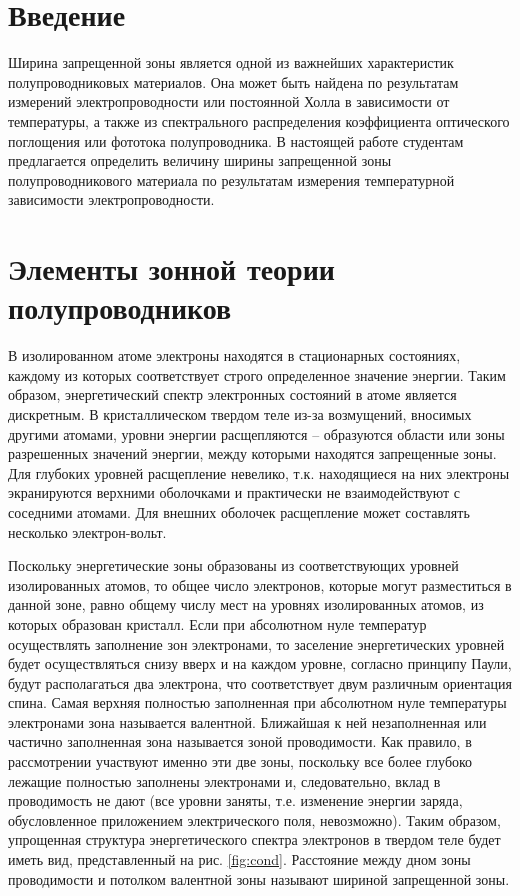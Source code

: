 

\renewcommand{\phi}{\varphi}



\def\labauthors{Виноградов И.Д., Шиков А.П.}
\def\labgroup{430}
\def\labnumber{1}
\def\labtheme{Измерение ширины запрещенной зоны}



\newpage
\section*{Введение}
Ширина запрещенной зоны является одной из важнейших характеристик полупроводниковых материалов. Она может быть найдена
по результатам измерений электропроводности или постоянной Холла в зависимости от температуры, а также из спектрального 
распределения коэффициента оптического поглощения или фототока полупроводника. В настоящей работе студентам предлагается
определить величину ширины запрещенной зоны полупроводникового материала по результатам измерения температурной зависимости 
электропроводности. 

\section{Элементы зонной теории полупроводников}
В изолированном атоме электроны находятся в стационарных состояниях, каждому из которых соответствует строго
определенное значение энергии. Таким образом, энергетический спектр электронных состояний в атоме является дискретным. В
кристаллическом твердом теле из-за возмущений, вносимых другими атомами, уровни энергии расщепляются – образуются
области или зоны разрешенных значений энергии, между которыми находятся запрещенные зоны. Для глубоких уровней
расщепление невелико, т.к. находящиеся на них электроны экранируются верхними оболочками и практически не
взаимодействуют с соседними атомами. Для внешних оболочек расщепление может составлять несколько электрон-вольт. 

Поскольку энергетические зоны образованы из соответствующих уровней изолированных атомов, то общее число электронов,
которые могут разместиться в данной зоне, равно общему числу мест на уровнях изолированных атомов, из которых образован
кристалл. Если при абсолютном нуле температур осуществлять заполнение зон электронами, то заселение энергетических
уровней будет осуществляться снизу вверх и на каждом уровне, согласно принципу Паули, будут располагаться два электрона,
что соответствует двум различным ориентация спина. Самая верхняя полностью заполненная при абсолютном нуле температуры
электронами зона называется валентной. Ближайшая к ней незаполненная или частично заполненная зона называется зоной
проводимости. Как правило, в рассмотрении участвуют именно эти две зоны, поскольку все более глубоко лежащие полностью
заполнены электронами и, следовательно, вклад в проводимость не дают (все уровни заняты, т.е. изменение энергии заряда,
обусловленное приложением электрического поля, невозможно). Таким образом, упрощенная структура энергетического спектра
электронов в твердом теле будет иметь вид, представленный на рис. \ref{fig:cond}. Расстояние между дном зоны проводимости и
потолком валентной зоны называют шириной запрещенной зоны. 

